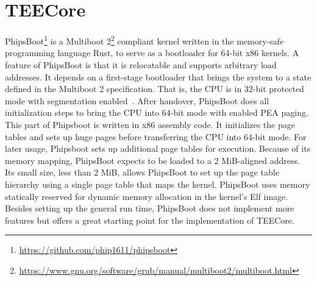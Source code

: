 \section{TEECore}
\label{sec:implementation:teeKernel}
PhipsBoot\footnote{\url{https://github.com/phip1611/phipsboot}} is a Multiboot
2\footnote{\url{https://www.gnu.org/software/grub/manual/multiboot2/multiboot.html}}
compliant kernel written in the memory-safe programming language Rust, to serve
as a bootloader for 64-bit x86 kernels. A feature of PhipsBoot is that it is
relocatable and supports arbitrary load addresses. It depends on a first-stage
bootloader that brings the
system to a state defined in the Multiboot 2 specification. That is, the CPU is
in 32-bit protected mode with segmentation enabled~\cite{mb2}. After handover,
PhipsBoot does all initialization steps to bring the CPU into 64-bit mode with
enabled PEA paging. This part of Phipsboot is written in x86 assembly code. It
initializes the page tables and sets up huge pages before transferring the CPU
into 64-bit mode. For later usage, Phipsboot sets up additional page tables for
execution. Because of its memory mapping, PhipsBoot expects to be loaded to a 2
MiB-aligned address. Its small size, less than 2 MiB, allows PhipsBoot to set up
the page table hierarchy using a single page table that maps the kernel.
PhipsBoot uses memory statically reserved for dynamic memory allocation in the
kernel's Elf image. Besides setting up the general run time, PhipsBoot does not
implement more features but offers a great starting point for the implementation
of TEECore.\\

